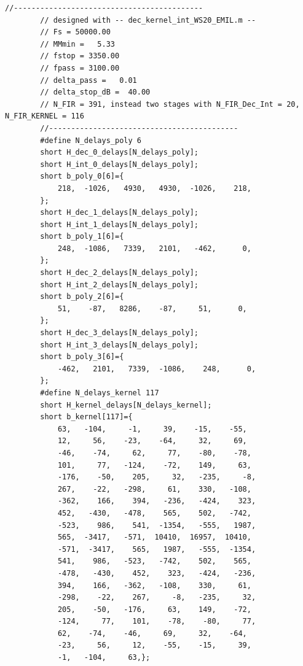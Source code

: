 \documentclass[a4paper,11pt]{article}
\begin{document}
	
	\begin{lstlisting}[style=ccode, caption={Generated header file \texttt{dec\_kernel\_int\_WS20\_EMIL.h} with the polyphase coefficients of the decimation/interpolation filter and the kernel coefficients, Section 3.2.2}, label={lst:header322}]
		//-------------------------------------------
		// designed with -- dec_kernel_int_WS20_EMIL.m --
		// Fs = 50000.00
		// MMmin =   5.33
		// fstop = 3350.00
		// fpass = 3100.00
		// delta_pass =   0.01
		// delta_stop_dB =  40.00
		// N_FIR = 391, instead two stages with N_FIR_Dec_Int = 20, N_FIR_KERNEL = 116
		//-------------------------------------------
		#define N_delays_poly 6
		short H_dec_0_delays[N_delays_poly];
		short H_int_0_delays[N_delays_poly];
		short b_poly_0[6]={
			218,  -1026,   4930,   4930,  -1026,    218,
		};
		short H_dec_1_delays[N_delays_poly];
		short H_int_1_delays[N_delays_poly];
		short b_poly_1[6]={
			248,  -1086,   7339,   2101,   -462,      0,
		};
		short H_dec_2_delays[N_delays_poly];
		short H_int_2_delays[N_delays_poly];
		short b_poly_2[6]={
			51,    -87,   8286,    -87,     51,      0,
		};
		short H_dec_3_delays[N_delays_poly];
		short H_int_3_delays[N_delays_poly];
		short b_poly_3[6]={
			-462,   2101,   7339,  -1086,    248,      0,
		};
		#define N_delays_kernel 117
		short H_kernel_delays[N_delays_kernel];
		short b_kernel[117]={
			63,   -104,     -1,     39,    -15,    -55,
			12,     56,    -23,    -64,     32,     69,
			-46,    -74,     62,     77,    -80,    -78,
			101,     77,   -124,    -72,    149,     63,
			-176,    -50,    205,     32,   -235,     -8,
			267,    -22,   -298,     61,    330,   -108,
			-362,    166,    394,   -236,   -424,    323,
			452,   -430,   -478,    565,    502,   -742,
			-523,    986,    541,  -1354,   -555,   1987,
			565,  -3417,   -571,  10410,  16957,  10410,
			-571,  -3417,    565,   1987,   -555,  -1354,
			541,    986,   -523,   -742,    502,    565,
			-478,   -430,    452,    323,   -424,   -236,
			394,    166,   -362,   -108,    330,     61,
			-298,    -22,    267,     -8,   -235,     32,
			205,    -50,   -176,     63,    149,    -72,
			-124,     77,    101,    -78,    -80,     77,
			62,    -74,    -46,     69,     32,    -64,
			-23,     56,     12,    -55,    -15,     39,
			-1,   -104,     63,};
	\end{lstlisting}
	
	
	
	
	
	
	
	
	
\end{document}
